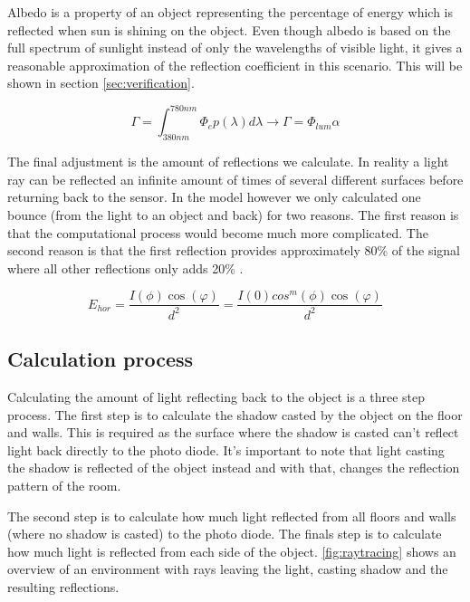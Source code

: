 Albedo is a property of an object representing the percentage of energy which is reflected when sun is shining on the object. Even though albedo is based on the full spectrum of sunlight instead of only the wavelengths of visible light, it gives a reasonable approximation of the reflection coefficient in this scenario. This will be shown in section \ref{sec:verification}.

\begin{equation}
\Gamma = \int_{380nm}^{780nm} \Phi_e p(\lambda) d\lambda \to \Gamma = \Phi_{lum} \alpha
\end{equation}

The final adjustment is the amount of reflections we calculate. In reality a light ray can be reflected an infinite amount of times of several different surfaces before returning back to the sensor. In the model however we only calculated one bounce (from the light to an object and back) for two reasons. The first reason is that the computational process would become much more complicated. The second reason is that the first reflection provides approximately 80\% of the signal where all other reflections only adds 20\% \cite{indoor_VLC_no_LOS}.

\begin{equation}
\label{eq:Ehor_new}
E_{hor}=\frac{I(\phi)\cos(\varphi)}{d^2}=\frac{I(0) cos^m(\phi)\cos(\varphi)}{d^2}
\end{equation}

\subsection{Calculation process}
Calculating the amount of light reflecting back to the object is a three step process. The first step is to calculate the shadow casted by the object on the floor and walls. This is required as the surface where the shadow is casted can't reflect light back directly to the photo diode. It's important to note that light casting the shadow is reflected of the object instead and with that, changes the reflection pattern of the room.

The second step is to calculate how much light reflected from all floors and walls (where no shadow is casted) to the photo diode. The finals step is to calculate how much light is reflected from each side of the object. \ref{fig:raytracing} shows an overview of an environment with rays leaving the light, casting shadow and the resulting reflections.

